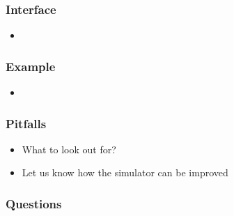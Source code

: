 \documentclass[t]{beamer}
\begin{document}
\begin{frame}
  \frametitle{Interface}
  
  \begin{itemize}
    \item 
  \end{itemize}
  
\end{frame}

\begin{frame}
  \frametitle{Example}
  
  \begin{itemize}
    \item 
  \end{itemize}
  
\end{frame}

\begin{frame}
  \frametitle{Pitfalls}
  
  \begin{itemize}
    \item What to look out for?
    \item Let us know how the simulator can be improved
  \end{itemize}
  
\end{frame}

\begin{frame}
  \frametitle{Questions}
  
\end{frame}
\end{document}
